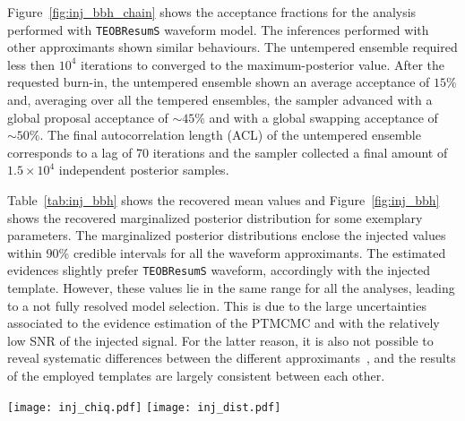 \documentclass[prd,aps,twocolumn,a4paper,showkeys,nofootinbib,floatfix]{revtex4-1}
\begin{document}
Figure~\ref{fig:inj_bbh_chain} shows the acceptance fractions 
for the analysis performed with {\tt TEOBResumS} waveform model.
The inferences performed with other approximants shown similar behaviours. 
The untempered ensemble required less then $10^{4}$ iterations to
converged to the maximum-posterior value.
After the requested burn-in, 
the untempered ensemble shown an average acceptance of $15\%$
and, averaging over all the tempered ensembles, 
the sampler advanced with a global proposal acceptance of ${\sim}45\%$
and with a global swapping acceptance of ${\sim}50\%$.
The final autocorrelation length (ACL) 
of the untempered ensemble corresponds to a lag of 70 iterations
and the sampler collected a final amount of $1.5{\times} 10^4$ 
independent posterior samples.

Table~\ref{tab:inj_bbh} shows the recovered mean values
and Figure~\ref{fig:inj_bbh} shows the recovered marginalized posterior distribution
for some exemplary parameters.
The marginalized posterior distributions 
enclose the injected values within 90\% credible intervals
for all the waveform approximants.
The estimated evidences slightly prefer {\tt TEOBResumS} waveform,
accordingly with the injected template.
However, these values lie in the same range for all the analyses,
leading to a not fully resolved model selection.
This is due to the large uncertainties associated to the evidence estimation
of the PTMCMC and with the relatively low SNR of the 
injected signal.
For the latter reason, it is also 
not possible to reveal systematic 
differences between the different approximants~\cite{Abbott:2016wiq},
and the results of the employed templates 
are largely consistent between each other.

\begin{figure*}[t]
	\centering 
	\texttt{[image: inj\_chiq.pdf]}
	\texttt{[image: inj\_dist.pdf]}
	\caption{Posterior distributions for $\{q,\chi_{\rm eff}\}$ and $\{D_L, \iota\}$ recovered from the injection studies 
					performed on a BBH signal with two inteferometers ({\tt H1}+{\tt L1}) at design sensitivities
					with network SNR of 14.
					The artificial signal has been generated with {\tt TEOBResumS} model and the injected parameters 
					are marked with black lines and squares.
					The contours represent the 50\% (thick) and the 90\% (thin) credible regions.
					The recovery has been performed with four different approximants 
					analysing the frequency range from 20~Hz to 1~kHz.
					The estimation of the luminosity distance is affected by the 
					degeneracy with the inclination angle~\cite{TheLIGOScientific:2016wfe}, 
					due to the correlations in the strain amplitude for aligned-spin sources.}
	\label{fig:inj_bbh}
\end{figure*}
\end{document}
